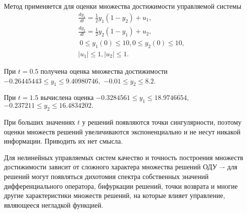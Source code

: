 Метод применяется для оценки множества достижимости управляемой системы
\begin{eqnarray}
\label{ex2}
 &&\frac{dy_{1}}{dt}=\frac{1}{2}y_{1}(1-y_{2})+u_1,\nonumber \\
&&\frac{dy_{2}}{dt}=\frac{1}{2}y_{2}(1-y_{1})+u_2,\\
&&\ 0  \le y_{1}(0) \le 10,  0 \le y_{2}(0) \le 10,\nonumber\\
&&\left|u_1\right|\le 1, \left|u_2 \right|\le 1. \nonumber
\end{eqnarray}

При $t=0.5$ получена оценка множества достижимости $-0.26445443 \le y_1 \le 9.40980746, $  $-0.01 \le y_2 \le 8.2. $

При $t=1.5$ вычислена оценка $-0.3284561 \le y_1 \le 18.9746654, $  $-0.237211 \le y_2 \le 16.4834202. $

При больших значениях $t$ у решений появляются точки сингулярности, поэтому оценки множеств  решений увеличиваются экспоненциально и не несут никакой информации. Приводить их нет смысла.

Для нелинейных управляемых систем качество и точность построения множеств достижимости зависит от сложного характера множества  решений ОДУ –- для решений могут появляться дихотомия спектра собственных значений дифференциального оператора, бифуркации решений, точки возврата и многие другие характеристики множеств решений, на которые влияет управление, являющееся негладкой функцией.



